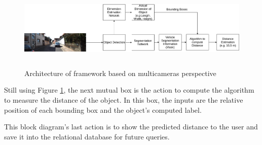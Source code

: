 \begin{figure}[H]
\centering
\includegraphics[width=\textwidth,height=40mm]{imagens/Network Behavior.png}
\caption{Architecture of framework based on multicameras perspective}
\label{fig:networkBehavior}
\end{figure}


Still using Figure \ref{fig:networkBehavior}, the next mutual box is the action to compute the algorithm to measure the distance of the object. In this box, the inputs are the relative position of each bounding box and the object's computed label. 

This block diagram's last action is to show the predicted distance to the user and save it into the relational database for future queries. 
